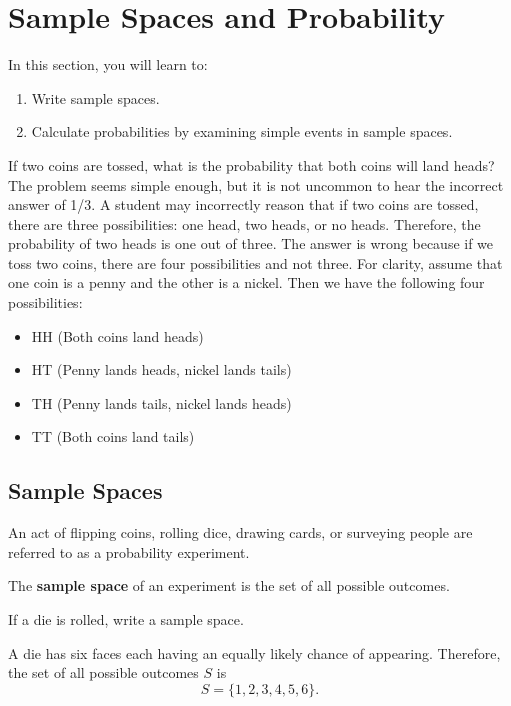 \section{Sample Spaces and Probability}

In this section, you will learn to:
\begin{enumerate}
    \item Write sample spaces.
    \item Calculate probabilities by examining simple events in sample spaces.
\end{enumerate}

If two coins are tossed, what is the probability that both coins will land heads? The problem seems simple enough, but it is not uncommon to hear the incorrect answer of 1/3. A student may incorrectly reason that if two coins are tossed, there are three possibilities: one head, two heads, or no heads. Therefore, the probability of two heads is one out of three. The answer is wrong because if we toss two coins, there are four possibilities and not three. For clarity, assume that one coin is a penny and the other is a nickel. Then we have the following four possibilities:
\begin{itemize}
    \item HH (Both coins land heads)
    \item HT (Penny lands heads, nickel lands tails)
    \item TH (Penny lands tails, nickel lands heads)
    \item TT (Both coins land tails)
\end{itemize}

\subsection{Sample Spaces}

An act of flipping coins, rolling dice, drawing cards, or surveying people are referred to as a probability experiment.

\begin{definition}
    The \textbf{sample space} of an experiment is the set of all possible outcomes.
\end{definition}

\begin{example}
    If a die is rolled, write a sample space.
\end{example}
\begin{solution}
    A die has six faces each having an equally likely chance of appearing. Therefore, the set of all possible outcomes \( S \) is
    \[ S = \{1, 2, 3, 4, 5, 6\}. \]
\end{solution}

